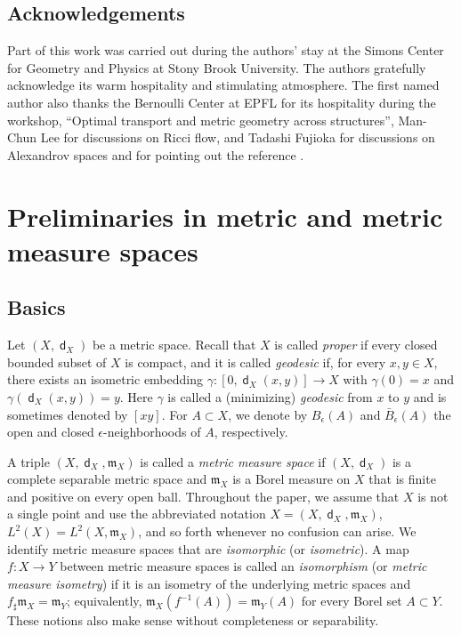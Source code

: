 \documentclass[11pt,reqno]{amsart}
\theoremstyle{definition}
\numberwithin{equation}{section}
\newcommand{\meas}{\mathfrak{m}}
\DeclareMathOperator{\dist}{\mathsf{d}}
\begin{document}
\subsection{Acknowledgements}
Part of this work was carried out during the authors' stay at the Simons Center for Geometry and Physics at Stony Brook University. The authors gratefully acknowledge
its warm hospitality and stimulating atmosphere. The first named author also thanks the Bernoulli Center at EPFL for its hospitality  during the workshop, ``Optimal transport and metric geometry across structures'', Man-Chun Lee for discussions on Ricci flow, and Tadashi Fujioka for discussions on  Alexandrov spaces and for pointing out the reference \cite{Bere}.



\section{Preliminaries in metric and metric measure spaces}\label{pre}
\subsection{Basics}\label{defgeodesic}
Let $(X, \dist_X)$ be a metric space. Recall that $X$ is called  \textit{proper} if every closed bounded subset of $X$ is compact, and it is called \textit{geodesic} if, for every $x,y\in X$, there exists an isometric embedding $\gamma:[0,\dist_X(x,y)]\to X$ with $\gamma(0)=x$ and $\gamma(\dist_X(x,y))=y$. Here $\gamma$ is called a (minimizing) \textit{geodesic} from $x$ to $y$ and is sometimes denoted by $[xy]$. For $A\subset X$, we denote by $B_{\epsilon}(A)$ and $\bar B_{\epsilon}(A)$ the open and closed $\epsilon$-neighborhoods of $A$, respectively. 

A triple  $(X, \dist_X, \meas_X)$ is called a \textit{metric measure space} if $(X, \dist_X)$ is a complete separable metric space and $\meas_X$  is a Borel measure on $X$ that is finite and positive on every open ball.  
    Throughout the paper, we assume that $X$ is not a single point and use the abbreviated notation $X=(X, \dist_X, \meas_X)$, $L^2(X)=L^2(X,\meas_X)$, and so forth whenever no confusion can arise. We identify metric measure spaces that are \textit{isomorphic} (or \textit{isometric}). A map $f:X\to Y$ between metric measure spaces is called an \textit{isomorphism} (or \textit{metric measure isometry}) if it is an isometry of the underlying metric spaces and $f_{\sharp}\meas_X=\meas_Y$; equivalently, $\meas_X(f^{-1}(A))=\meas_Y(A)$ for every Borel set $A\subset Y$. These notions also make sense without completeness or separability.
\end{document}
